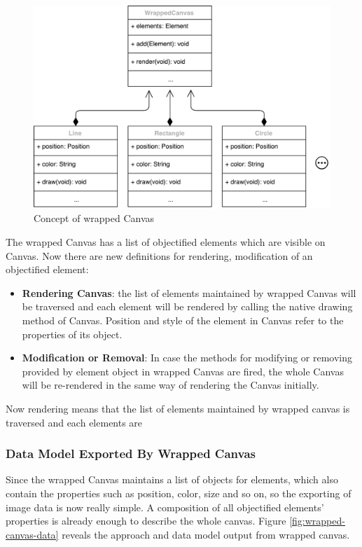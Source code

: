 \begin{figure}[!htbp]
  \centering
    \includegraphics[width=1\textwidth]{Figures/concept-wrapped-canvas.pdf}
  \caption{Concept of wrapped Canvas}
  \label{fig:wrapped-canvas}
\end{figure}
The wrapped Canvas has a list of objectified elements which are visible on Canvas. Now there are new definitions for rendering, modification of an objectified element:
\begin{itemize}
\item
\textbf{Rendering Canvas}: the list of elements maintained by wrapped Canvas will be traversed and each element will be rendered by calling the native drawing method of Canvas. Position and style of the element in Canvas refer to the properties of its object.  
\item
\textbf{Modification or Removal}: In case the methods for modifying or removing provided by element object in wrapped Canvas are fired, the whole Canvas will be re-rendered in the same way of rendering the Canvas initially.

\end{itemize}
Now rendering means that the list of elements maintained by wrapped canvas is traversed and each elements are 

\subsubsection{Data Model Exported By Wrapped Canvas}
Since the wrapped Canvas maintains a list of objects for elements, which also contain the properties such as position, color, size and so on, so the exporting of image data is now really simple. A composition of all objectified elements' properties is already enough to describe the whole canvas. Figure \ref{fig:wrapped-canvas-data} reveals the approach and data model output from wrapped 
canvas.

